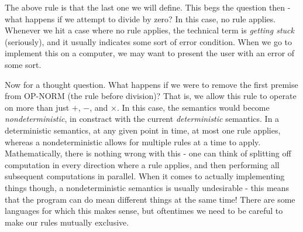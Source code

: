 \documentclass[nocopyrightspace]{sigplanconf}
\begin{document}
The above rule is that the last one we will define.
This begs the question then - what happens if we attempt to divide by zero?
In this case, no rule applies.
Whenever we hit a case where no rule applies, the technical term is \emph{getting stuck} (seriously), and it usually indicates some sort of error condition.
When we go to implement this on a computer, we may want to present the user with an error of some sort.

Now for a thought question.
What happens if we were to remove the first premise from OP-NORM (the rule before division)?
That is, we allow this rule to operate on more than just $+$, $-$, and $\times$.
In this case, the semantics would become \emph{nondeterministic}, in constract with the current \emph{deterministic} semantics.
In a deterministic semantics, at any given point in time, at most one rule applies, whereas a nondeterministic allows for multiple rules at a time to apply.
Mathematically, there is nothing wrong with this - one can think of splitting off computation in every direction where a rule applies, and then performing all subsequent computations in parallel.
When it comes to actually implementing things though, a nondeterministic semantics is usually undesirable - this means that the program can do mean different things at the same time!
There are some languages for which this makes sense, but oftentimes we need to be careful to make our rules mutually exclusive.
\end{document}

